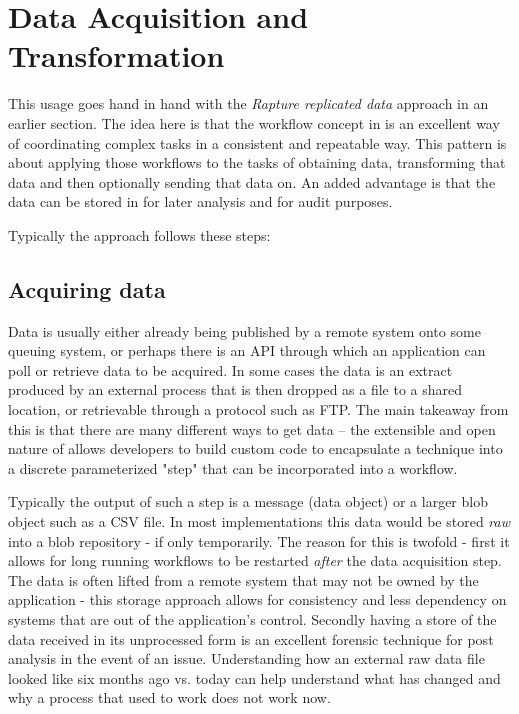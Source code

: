 \section{Data Acquisition and Transformation}
This usage goes hand in hand with the \emph{Rapture replicated data} approach in an earlier section. The idea here is
that the workflow concept in \Rapture is an excellent way of coordinating complex tasks in a consistent and repeatable way. This pattern is about applying those
workflows to the tasks of obtaining data, transforming that data and then optionally sending that data on. An added advantage is that
the data can be stored in \Rapture for later analysis and for audit purposes.

Typically the approach follows these steps:

\subsection{Acquiring data}
Data is usually either already being published by a remote system onto some queuing system, or perhaps there is an API through which an application
can poll or retrieve data to be acquired. In some cases the data is an extract produced by an external process that is then dropped as a file to
a shared location, or retrievable through a protocol such as FTP. The main takeaway from this is that there are many different ways to get data -- the extensible and open
nature of \Rapture allows developers to build custom code to encapsulate a technique into a discrete parameterized "step" that can be incorporated into a workflow.

Typically the output of such a step is a message (data object) or a larger blob object such as a CSV file. In most implementations this data would be stored \emph{raw} into
a \Rapture blob repository - if only temporarily. The reason for this is twofold - first it allows for long running workflows to be restarted \emph{after} the data acquisition
step. The data is often lifted from a remote system that may not be owned by the application - this storage approach allows for consistency and less dependency on systems that
are out of the application's control. Secondly having a store of the data received in its unprocessed form is an excellent forensic technique for post analysis in the event
of an issue. Understanding how an external raw data file looked like six months ago vs. today can help understand what has changed and why a process that used to work
does not work now.

